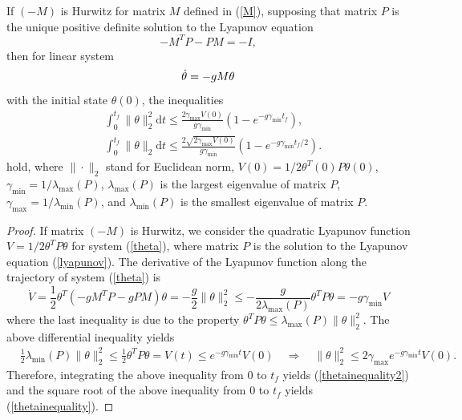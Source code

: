 \documentclass[12pt,draftcls,onecolumn]{IEEEtran}  %
\begin{document}
\begin{Lem}\label{norminequality}
If $(-M)$ is Hurwitz for matrix $M$ defined in (\ref{M}), supposing that matrix $P$ is the unique positive definite solution to the Lyapunov equation
\begin{equation}
-M^TP-PM=-I,\label{lyapunov}
\end{equation}
then for linear system
\begin{equation}
\dot{\theta}=-gM\theta\label{theta}\\
\end{equation}
with the initial state $\theta(0)$, the inequalities
\begin{subequations}\label{thetainequalitytotal}
\begin{align}
&\int^{t_f}_0\|\theta\|_2^2\mbox{d}t\leq \frac{2\gamma_{\max}V(0)}{g\gamma_{\min}} (1-e^{-g\gamma_{\min}t_f}),\label{thetainequality2}\\
&\int^{t_f}_0\|\theta\|_2\mbox{d}t\leq  \frac{2\sqrt{2\gamma_{\max}V(0)}}{g\gamma_{\min}} (1-e^{-g\gamma_{\min}t_f/2})\label{thetainequality}.
\end{align}
\end{subequations}
hold, where $\|\cdot\|_2$ stand for Euclidean norm, $V(0)=1/2\theta^T(0)P\theta(0)$, $\gamma_{\min}=1/\lambda_{\max}(P)$, $\lambda_{\max}(P)$ is the largest eigenvalue of matrix $P$, $\gamma_{\max}=1/\lambda_{\min}(P)$, and $\lambda_{\min}(P)$ is the smallest eigenvalue of matrix $P$.
\end{Lem}
\begin{proof}
If matrix $(-M)$ is Hurwitz, we consider the quadratic Lyapunov function $V=1/2\theta^TP\theta$ for system (\ref{theta}), where matrix $P$ is the solution to the Lyapunov equation (\ref{lyapunov}). The derivative of the Lyapunov function along the trajectory of system (\ref{theta}) is
\[\dot{V}=\frac{1}{2}\theta^T(-gM^TP-gPM)\theta= -\frac{g}{2}\|\theta\|^2_2\leq -\frac{g}{2\lambda_{\max}(P)}\theta^TP\theta= -g\gamma_{\min} V\]
where the last inequality is due to the property $\theta^TP\theta\leq \lambda_{\max}(P)\|\theta\|_2^2$. The above differential inequality yields
\begin{align*}
&\frac{1}{2}\lambda_{\min}(P)\|\theta\|_2^2\leq \frac{1}{2}\theta^TP\theta=V(t)\leq e^{ -g\gamma_{\min} t}V(0)\quad
\Longrightarrow\quad \|\theta\|^2_2\leq 2\gamma_{\max}e^{ -g\gamma_{\min} t}V(0).
\end{align*}
Therefore, integrating the above inequality from $0$ to $t_f$ yields (\ref{thetainequality2}) and the square root of the above inequality from $0$ to $t_f$ yields (\ref{thetainequality}).
\end{proof}
\end{document}
